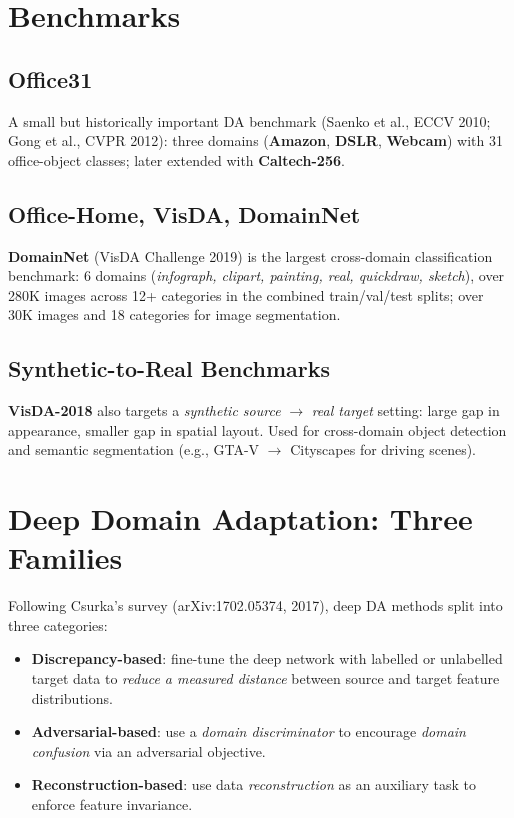 \documentclass[11pt,a4paper]{article}
\theoremstyle{definition}
\theoremstyle{plain}
\theoremstyle{remark}
\begin{document}
\section{Benchmarks}

\subsection{Office31}

A small but historically important DA benchmark (Saenko et al., ECCV 2010; Gong et al., CVPR 2012): three domains (\textbf{Amazon}, \textbf{DSLR}, \textbf{Webcam}) with 31 office-object classes; later extended with \textbf{Caltech-256}.

\subsection{Office-Home, VisDA, DomainNet}

\textbf{DomainNet} (VisDA Challenge 2019) is the largest cross-domain classification benchmark: 6 domains (\emph{infograph, clipart, painting, real, quickdraw, sketch}), over 280K images across 12+ categories in the combined train/val/test splits; over 30K images and 18 categories for image segmentation.

\subsection{Synthetic-to-Real Benchmarks}

\textbf{VisDA-2018} also targets a \emph{synthetic source} $\to$ \emph{real target} setting: large gap in appearance, smaller gap in spatial layout. Used for cross-domain object detection and semantic segmentation (e.g., GTA-V $\to$ Cityscapes for driving scenes).


\section{Deep Domain Adaptation: Three Families}

Following Csurka's survey (arXiv:1702.05374, 2017), deep DA methods split into three categories:

\begin{itemize}
    \item \textbf{Discrepancy-based}: fine-tune the deep network with labelled or unlabelled target data to \emph{reduce a measured distance} between source and target feature distributions.
    \item \textbf{Adversarial-based}: use a \emph{domain discriminator} to encourage \emph{domain confusion} via an adversarial objective.
    \item \textbf{Reconstruction-based}: use data \emph{reconstruction} as an auxiliary task to enforce feature invariance.
\end{itemize}
\end{document}
